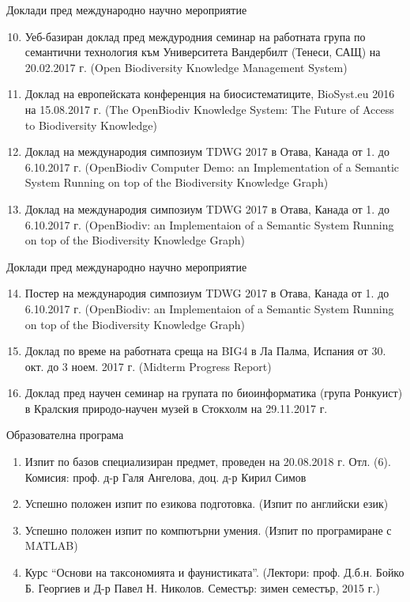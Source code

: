 \documentclass[bulgarian]{beamer}
\begin{document}
\begin{frame}{Доклади пред международно научно мероприятие}
    \begin{enumerate}
    \setcounter{enumi}{9}
     \item Уеб-базиран доклад пред междуродния семинар на работната група по семантични технология към Университета Вандербилт (Тенеси, САЩ) на 20.02.2017 г. (Open Biodiversity Knowledge Management System)
    \item Доклад на европейската конференция на биосистематиците, BioSyst.eu 2016 на 15.08.2017 г. (The OpenBiodiv Knowledge System: The Future of Access to Biodiversity Knowledge)
    \item Доклад на международия симпозиум TDWG 2017 в Отава, Канада от 1. до 6.10.2017 г. (OpenBiodiv Computer Demo: an Implementation of a Semantic System Running on top of the Biodiversity Knowledge Graph)
    \item Доклад на международия симпозиум TDWG 2017 в Отава, Канада от 1. до 6.10.2017 г. (OpenBiodiv: an Implementaion of a Semantic System Running on top of the Biodiversity Knowledge Graph)
   
    \end{enumerate}
\end{frame}


\begin{frame}{Доклади пред международно научно мероприятие}
\begin{enumerate}
    \setcounter{enumi}{13}
     \item Постер на международия симпозиум TDWG 2017 в Отава, Канада от 1. до 6.10.2017 г. (OpenBiodiv: an Implementaion of a Semantic System Running on top of the Biodiversity Knowledge Graph)
    \item Доклад по време на работната среща на BIG4 в Ла Палма, Испания от 30. окт. до 3 ноем. 2017 г. (Midterm Progress Report)
    \item Доклад пред научен семинар на групата по биоинформатика (група Ронкуист) в Кралския природо-научен музей в Стокхолм на 29.11.2017 г.
\end{enumerate}
\end{frame}



\begin{frame}{Образователна програма}

\begin{enumerate}
    \item Изпит по базов специализиран предмет, проведен на 20.08.2018 г. Отл. (6). Комисия: проф. д-р Галя Ангелова, доц. д-р Кирил Симов
    \item Успешно положен изпит по езикова подготовка. (Изпит по английски език)   
    \item Успешно положен изпит по компютърни умения. (Изпит по програмиране с MATLAB)
    \item Курс ``Основи на таксономията и фаунистиката''. (Лектори: проф. Д.б.н. Бойко Б. Георгиев и Д-р Павел Н. Николов. Семестър: зимен семестър, 2015 г.)
 

\end{enumerate}

\end{frame}
\end{document}
